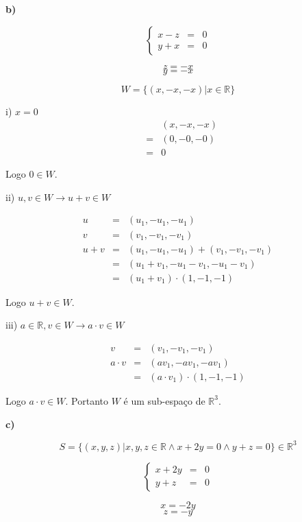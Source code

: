 \documentclass[11pt]{article}
\newenvironment{question}[1]
  {\par\addvspace{\medskipamount}
   \noindent\makebox[0pt][r]{\textbf{#1)} }\ignorespaces}
  {\par\addvspace{\medskipamount}}
\begin{document}
\begin{question}{3}

\textbf{b)}

$$
\left\{\begin{array}{rcl}
  x-z &= &0\\
  y+x &= &0
\end{array}\right.
$$

$$z = -x$$
$$y = -x$$
    
$$W = \{(x,-x,-x)|x \in \mathbb{R}\}$$

i) $x = 0$
$$
\begin{array}{rcl}
    &  &(x,-x,-x)\\
    &= &(0,-0,-0)\\
    &= &0
\end{array}
$$

Logo $0 \in W$.

\bigskip
ii) $u,v \in W \rightarrow u+v \in W$

$$
\begin{array}{rcl}
    u &= &(u_1,-u_1,-u_1)\\
    v &= &(v_1,-v_1,-v_1)\\
    u + v &= &(u_1,-u_1,-u_1) + (v_1,-v_1,-v_1)\\
          &= &(u_1+v_1,-u_1-v_1,-u_1-v_1)\\
          &= &(u_1+v_1) \cdot (1,-1,-1)
\end{array}
$$

Logo $u + v \in W$.

\bigskip
iii) $a \in \mathbb{R}, v \in W \rightarrow a \cdot v \in W$

$$
\begin{array}{rcl}
    v &= &(v_1,-v_1,-v_1)\\
    a \cdot v &= &(a v_1,-a v_1,-a v_1)\\
          &= &(a \cdot v_1) \cdot (1,-1,-1)
\end{array}
$$

Logo $a \cdot v \in W$. Portanto $W$ é um sub-espaço de $\mathbb{R}^3$.

\textbf{c)}

$$S = \{(x,y,z)|x,y,z \in \mathbb{R} \land x+2y=0 \land y+z=0\} \in \mathbb{R}^3$$

$$
\left\{\begin{array}{rcl}
  x+2y &= &0\\
  y+z  &= &0
\end{array}\right.
$$

$$x = -2y$$
$$z = -y$$
    

\end{question}
\end{document}
